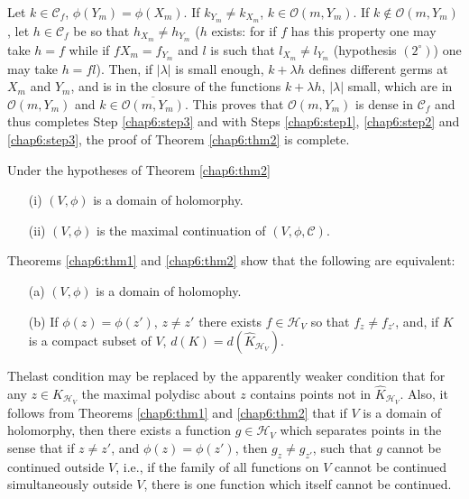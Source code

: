 Let $k \in\mathscr{C}_f$, $\phi(Y_m) = \phi(X_m)$. If $k_{Y_m} \neq
k_{X_m}$, $k \in \mathscr{O}(m, Y_m)$. If $k \not\in
\mathscr{O}(m,Y_m)$, let $h \in \mathscr{C}_f$ be so that $h_{X_m}
\neq h_{Y_m}$ ($h$ exists: for if $f$ has this property one may take
$h = f$ while if $fX_m = f_{Y_m}$ and $l$ is such that $l_{X_m} \neq
l_{Y_m}$ (hypothesis $(2^\circ)$) one may take $h = fl$). Then, if
$|\lambda|$ is small enough, $k + \lambda h $ defines different germs
at $X_m$ and $Y_m$, and is in the closure of the functions $k +
\lambda h$, $|\lambda|$ small, which are in $\mathscr{O}(m,Y_m)$ and
$k \in \overline{\mathscr{O} (m, Y_m)}$. This proves that
$\mathscr{O}(m, Y_m)$ is dense in $\mathscr{C}_f$ and thus completes
Step \ref{chap6:step3} and with Steps \ref{chap6:step1},
\ref{chap6:step2} and \ref{chap6:step3}, the proof of Theorem 
\ref{chap6:thm2} is complete.  

\begin{coro*}
Under the hypotheses of Theorem \ref{chap6:thm2} 
\begin{itemize}
\item[(i)] $(V, \phi)$ is a domain of holomorphy.

\item[(ii)] $(V, \phi)$ is the maximal continuation of $(V, \phi,
  \mathscr{C})$. 
\end{itemize}

Theorems \ref{chap6:thm1} and \ref{chap6:thm2} show that the following
are equivalent: 
\begin{itemize}
\item[(a)] $(V, \phi)$ is a domain of holomophy.

\item[(b)] If $\phi(z) = \phi(z')$, $z \neq z'$ there exists $f \in
  \mathscr{H}_V$ so that $f_z \neq f_{z'}$, and, if $K$ is a compact
  subset of $V$, $d(K) = d (\hat{K}_{\mathscr{H}_V})$. 
\end{itemize}

The\pageoriginale last condition may be replaced by the apparently
weaker condition that for any $z \in \hat{K}_{\mathscr{H}_V}$ the
maximal polydisc about $z$ contains points not in
$\hat{K}_{\mathscr{H}_V}$. Also, it follows from Theorems
\ref{chap6:thm1} and \ref{chap6:thm2} that 
if $V$ is a domain of holomorphy, then there exists a function $g \in
\mathscr{H}_V$ which separates points in the sense that if $z \neq
z'$, and $\phi(z) = \phi(z')$, then $g_z \neq g_{z'}$, such that $g$
cannot be continued outside $V$, i.e., if the family of all functions
on $V$ cannot be continued simultaneously outside $V$, there is one
function which itself cannot be continued. 
\end{coro*}
